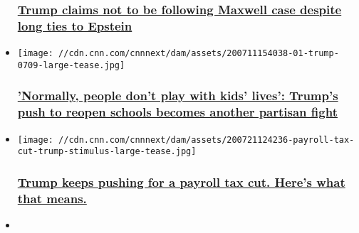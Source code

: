\begin{itemize}
  \hypertarget{trump-claims-not-to-be-following-maxwell-case-despite-long-ties-to-epstein}{%
  \subsubsection{\texorpdfstring{\href{/2020/07/23/politics/donald-trump-ghislaine-maxwell-jeffrey-epstein-history/index.html}{Trump
  claims not to be following Maxwell case despite long ties to
  Epstein}}{Trump claims not to be following Maxwell case despite long ties to Epstein}}\label{trump-claims-not-to-be-following-maxwell-case-despite-long-ties-to-epstein}}
\item
  \href{/2020/07/14/politics/trump-schools-reopening/index.html}{}

  \texttt{[image: //cdn.cnn.com/cnnnext/dam/assets/200711154038-01-trump-0709-large-tease.jpg]}

  \hypertarget{normally-people-dont-play-with-kids-lives-trumps-push-to-reopen-schools-becomes-another-partisan-fight}{%
  \subsubsection{\texorpdfstring{\href{/2020/07/14/politics/trump-schools-reopening/index.html}{'Normally,
  people don't play with kids' lives': Trump's push to reopen schools
  becomes another partisan
  fight}}{'Normally, people don't play with kids' lives': Trump's push to reopen schools becomes another partisan fight}}\label{normally-people-dont-play-with-kids-lives-trumps-push-to-reopen-schools-becomes-another-partisan-fight}}
\item
  \href{/2020/07/21/politics/payroll-tax-cut-trump-congress-relief-negotiations/index.html}{}

  \texttt{[image: //cdn.cnn.com/cnnnext/dam/assets/200721124236-payroll-tax-cut-trump-stimulus-large-tease.jpg]}

  \hypertarget{trump-keeps-pushing-for-a-payroll-tax-cut-heres-what-that-means}{%
  \subsubsection{\texorpdfstring{\href{/2020/07/21/politics/payroll-tax-cut-trump-congress-relief-negotiations/index.html}{Trump
  keeps pushing for a payroll tax cut. Here's what that
  means.}}{Trump keeps pushing for a payroll tax cut. Here's what that means.}}\label{trump-keeps-pushing-for-a-payroll-tax-cut-heres-what-that-means}}
\item
  \href{/2020/07/12/politics/trump-exercise-golf/index.html}{}


\end{itemize}
